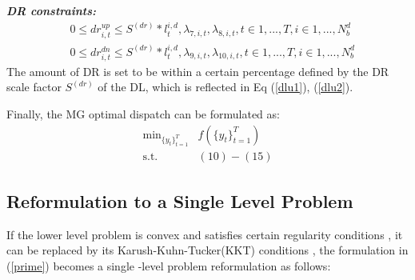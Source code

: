 \textbf{\emph{DR constraints:} }
\begin{align}
&0\leq dr_{i,t}^{up}\leq S^(dr)*l^{i,d}_t, \lambda_{7,i,t},\lambda_{8,i,t},t\in{1,...,T}, i\in{1,...,N_b^d}  \label{dlu1}\\
&0\leq dr_{i,t}^{dn}\leq S^(dr)*l^{i,d}_t, \lambda_{9,i,t},\lambda_{10,i,t},t\in{1,...,T}, i\in{1,...,N_b^d}  \label{dlu2}
\end{align} 
The amount of DR is set to be within a certain percentage defined by the DR scale factor $S^(dr)$ of the DL, which is reflected in Eq (\ref{dlu1}), (\ref{dlu2}).

%

Finally, the MG optimal dispatch can be formulated as: 
\begin{subequations}
\begin{align}
\text{min}_{\{y_t\}^{T}_{t=1}} & f\left(\{y_t\}^{T}_{t=1}\right)\nonumber\\
\text{s.t.  }  & (10) - (15)\nonumber
\end{align}
\end{subequations}

\subsection{Reformulation to a Single Level Problem}
If the lower level problem is convex and satisfies certain regularity conditions \cite{convex}, it can be replaced by its Karush-Kuhn-Tucker(KKT) conditions \cite{bilevel1}, the formulation in (\ref{prime}) becomes a single -level problem reformulation as follows:


